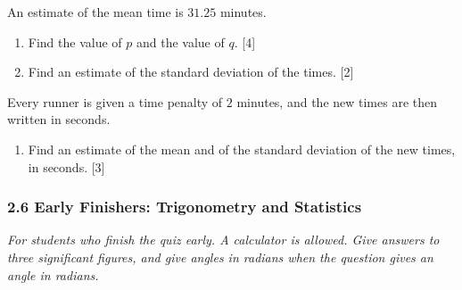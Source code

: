 \documentclass[12pt, twoside]{article}
\begin{document}
\begin{enumerate}[itemsep=0.15cm]
An estimate of the mean time is $31.25$ minutes.

\begin{enumerate}[itemsep=0.1cm]
  \item Find the value of $p$ and the value of $q$. \hfill [4]
  \item Find an estimate of the standard deviation of the times.
  \hfill [2]
\end{enumerate}

Every runner is given a time penalty of $2$ minutes, and the new times are
then written in seconds.

\begin{enumerate}[itemsep=0.1cm]
  \item[(c)] Find an estimate of the mean and of the standard deviation of
  the new times, in seconds. \hfill [3]
\end{enumerate}


\end{enumerate}

\newpage

\subsubsection*{2.6 Early Finishers: Trigonometry and Statistics}

\emph{For students who finish the quiz early. A calculator is allowed. Give
answers to three significant figures, and give angles in radians when the
question gives an angle in radians.}
\end{document}
